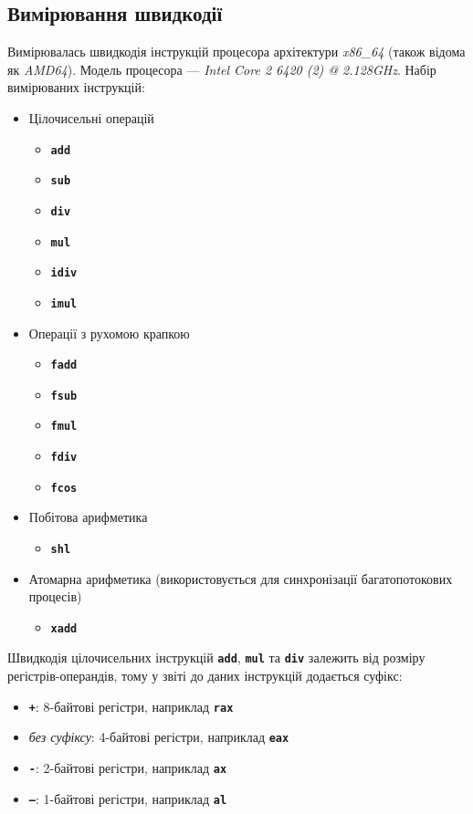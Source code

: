 \documentclass[a4paper]{article}
\newcommand{\code}[1]{\textbf{\texttt{#1}}}
\begin{document}
\subsection{Вимірювання швидкодії}

Вимірювалась швидкодія інструкцій процесора архітектури \emph{x86\_64}
(також відома як \emph{AMD64}).
Модель процесора — \emph{Intel Core 2 6420 (2) @ 2.128GHz}.
Набір вимірюваних інструкцій:

\begin{itemize}
  \item Цілочисельні операцій
    \begin{itemize}
      \item \code{add}
      \item \code{sub}
      \item \code{div}
      \item \code{mul}
      \item \code{idiv}
      \item \code{imul}
    \end{itemize}
  \item Операції з рухомою крапкою
    \begin{itemize}
      \item \code{fadd}
      \item \code{fsub}
      \item \code{fmul}
      \item \code{fdiv}
      \item \code{fcos}
    \end{itemize}
  \item Побітова арифметика
    \begin{itemize}
      \item \code{shl}
    \end{itemize}
  \item Атомарна арифметика (використовується для синхронізації багатопотокових процесів)
    \begin{itemize}
      \item \code{xadd}
    \end{itemize}
\end{itemize}

Швидкодія цілочисельних інструкцій \code{add}, \code{mul} та \code{div} залежить
від розміру регістрів-операндів, тому у звіті до даних інструкцій додається суфікс:

\begin{itemize}
  \item \code{+}: 8-байтові регістри, наприклад \code{rax}
  \item \emph{без суфіксу}: 4-байтові регістри, наприклад \code{eax}
  \item \code{-}: 2-байтові регістри, наприклад \code{ax}
  \item \code{--}: 1-байтові регістри, наприклад \code{al}
\end{itemize}
\end{document}
